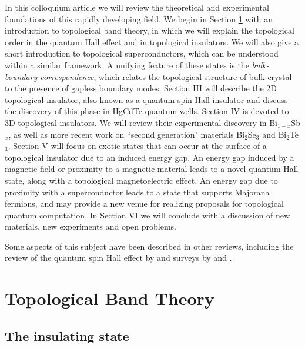 \documentclass[twocolumn,floatfix,showpacs,rmp,aps]{revtex4}
\begin{document}
	In this colloquium article we will review the theoretical and
	experimental foundations of this rapidly developing field.  We
	begin in Section \ref{sec:topobandtheory} with an introduction to
	topological band theory, in which we will explain the topological
	order in the quantum Hall effect and in topological insulators.
	We will also give a short introduction to topological superconductors,
	which can be understood within a similar framework.
	A unifying feature of these states is the {\it bulk-boundary correspondence}, which
	relates the topological structure of bulk crystal to the presence of gapless boundary modes.
	Section III will describe the 2D topological insulator,
	also known as a quantum spin Hall insulator and discuss the
	discovery of this phase in HgCdTe quantum wells.
	Section IV is devoted to 3D topological insulators.
	We will review their experimental discovery in Bi$_{1-x}$Sb$_x$, as well as more
	recent work on ``second generation" materials Bi$_2$Se$_3$ and
	Bi$_2$Te$_3$.
	Section V
	will focus on exotic states that can occur at the surface of a topological
	insulator due to an induced energy gap.  An energy gap induced by a magnetic
	field or proximity to a magnetic material leads to a
	novel quantum Hall state, along with a topological
	magnetoelectric effect.  An energy gap due to proximity with a superconductor leads to a
	state that supports Majorana fermions, and may provide a new venue
	for realizing proposals for topological quantum computation.
	In Section VI we will conclude with a discussion of new materials, new
	experiments and open problems.
	
	Some aspects of this subject have been described in other reviews, including
	the review of the quantum spin Hall effect by \textcite{konig08} and surveys
	by \textcite{qizhang10} and \textcite{moore10}.
	
	
	
	
	\section{Topological Band Theory}
	\label{sec:topobandtheory}
	
	\subsection{The insulating state}
	\label{sec:insulator}
	
\end{document}
